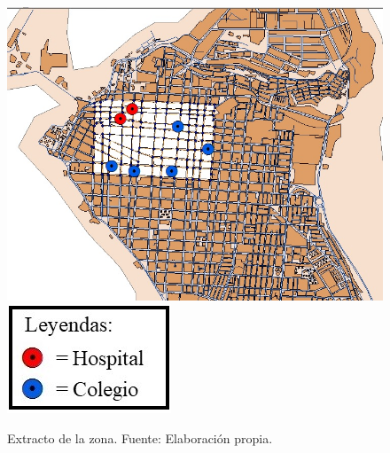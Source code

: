 \documentclass[12pt,a4paper]{article}
\begin{document}
\begin{figure}[h!]
	\centering
	\includegraphics[scale=0.5]{Figuras/mapa2.jpg} 
	\includegraphics[scale=0.5]{Figuras/simb1.jpg}
	\caption{Extracto de la zona. Fuente: Elaboración propia.}
	\label{fig:fig4}
\end{figure}
\end{document}
